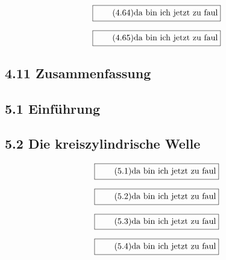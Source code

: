 \documentclass[11pt]{article}
\newcommand{\1}{ {\mathds{1}} }
\begin{document}
    \begin{equation}
      \boxed{
        \tag{4.64}
        \begin{split}
          \text{da bin ich jetzt zu faul}
        \end{split}
      }
    \end{equation}

    \begin{equation}
      \boxed{
        \tag{4.65}
        \begin{split}
          \text{da bin ich jetzt zu faul}
        \end{split}
      }
    \end{equation}

    \subsection*{4.11 Zusammenfassung}
	
    \subsection*{5.1 Einführung}
    \subsection*{5.2 Die kreiszylindrische Welle}

    \begin{equation}
      \boxed{
        \tag{5.1}
        \begin{split}
          \text{da bin ich jetzt zu faul}
        \end{split}
      }
    \end{equation}
    
    \begin{equation}
      \boxed{
        \tag{5.2}
        \begin{split}
          \text{da bin ich jetzt zu faul}
        \end{split}
      }
    \end{equation}

    \begin{equation}
      \boxed{
        \tag{5.3}
        \begin{split}
          \text{da bin ich jetzt zu faul}
        \end{split}
      }
    \end{equation}

    \begin{equation}
      \boxed{
        \tag{5.4}
        \begin{split}
          \text{da bin ich jetzt zu faul}
        \end{split}
      }
    \end{equation}
    
\end{document}
